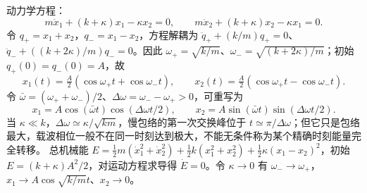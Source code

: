 动力学方程：
\[m\ddot x_1+(k+\kappa)x_1-\kappa x_2=0,\qquad m\ddot x_2+(k+\kappa)x_2-\kappa x_1=0.\]
令 \(q_+=x_1+x_2\)，\(q_-=x_1-x_2\)，方程解耦为 \(\ddot q_++(k/m)q_+=0\)、\(\ddot q_-+((k+2\kappa)/m)q_-=0\)。因此 \(\omega_+=\sqrt{k/m}\)、\(\omega_-=\sqrt{(k+2\kappa)/m}\)；初始 \(q_+(0)=q_-(0)=A\)，故
\[x_1(t)=\tfrac A2(\cos\omega_+t+\cos\omega_-t),\qquad x_2(t)=\tfrac A2(\cos\omega_+t-\cos\omega_-t).\]
令 \(\bar\omega=(\omega_++\omega_-)/2\)、\(\Delta\omega=\omega_--\omega_+>0\)，可重写为
\[x_1=A\cos(\bar\omega t)\cos(\Delta\omega t/2),\qquad x_2=A\sin(\bar\omega t)\sin(\Delta\omega t/2).\]
当 \(\kappa\ll k\)，\(\Delta\omega\simeq\kappa/\sqrt{km}\)，慢包络的第一次交换峰位于 \(t\simeq\pi/\Delta\omega\)；但它只是包络最大，载波相位一般不在同一时刻达到极大，不能无条件称为某个精确时刻能量完全转移。
总机械能 \(E=\tfrac12m(\dot x_1^2+\dot x_2^2)+\tfrac12k(x_1^2+x_2^2)+\tfrac12\kappa(x_1-x_2)^2\)，初始 \(E=(k+\kappa)A^2/2\)，对运动方程求导得 \(\dot E=0\)。令 \(\kappa\to0\) 有 \(\omega_-\to\omega_+\)，\(x_1\to A\cos\sqrt{k/m}t\)、\(x_2\to0\)。
